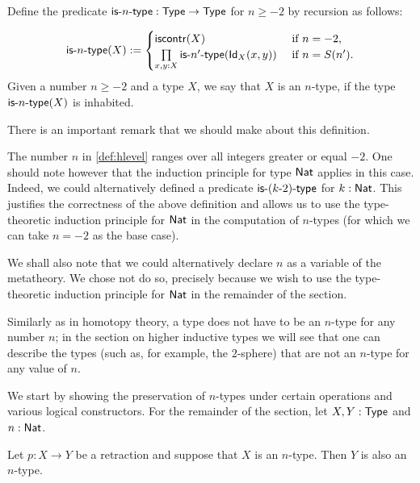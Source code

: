 \begin{defn}\label{def:hlevel}
  Define the predicate $\istype{n} : \Type \to \Type$ for $n \geq -2$ by recursion as follows:

\[ \istype{n}(X) := \begin{cases}
                         \iscontr(X) & \text{ if } n = -2 , \\
                         \prod\limits_{x,y : X}\istype{n'}(\idtype[X]{x}{y}) & \text{ if } n = S(n') .
                        \end{cases}
\]
%
Given a number $n \geq -2$ and a type $X$, we say that $X$ is an $n$-type, if the type $\istype{n}(X)$ is inhabited.
\end{defn}

There is an important remark that we should make about this definition.

\begin{rmk}
 The number $n$ in \autoref{def:hlevel} ranges over all integers greater or equal $-2$. One should note however that the induction principle for type $\Nat$ applies in this case. Indeed, we could alternatively defined a predicate $\istype{(k\mbox{-}2)}$ for $k : \Nat$. This justifies the correctness of the above definition and allows us to use the type-theoretic induction principle for $\Nat$ in the computation of $n$-types (for which we can take $n = -2$ as the base case).
 
 We shall also note that we could alternatively declare $n$ as a variable of the metatheory. We chose not do so, precisely because we wish to use the type-theoretic induction principle for $\Nat$ in the remainder of the section.
\end{rmk}

Similarly as in homotopy theory, a type does not have to be an $n$-type for any number $n$; in the section on higher inductive types we will see that one can describe the types (such as, for example, the $2$-sphere) that are not an $n$-type for any value of $n$.

We start by showing the preservation of $n$-types under certain operations and various logical constructors.
For the remainder of the section, let $X, Y : \Type$ and $n : \Nat$.
\begin{thm}\label{thm:h-level-retracts}
 Let $p \colon X \to Y$ be a retraction and suppose that $X$ is an $n$-type. Then $Y$ is also an $n$-type.
\end{thm}

